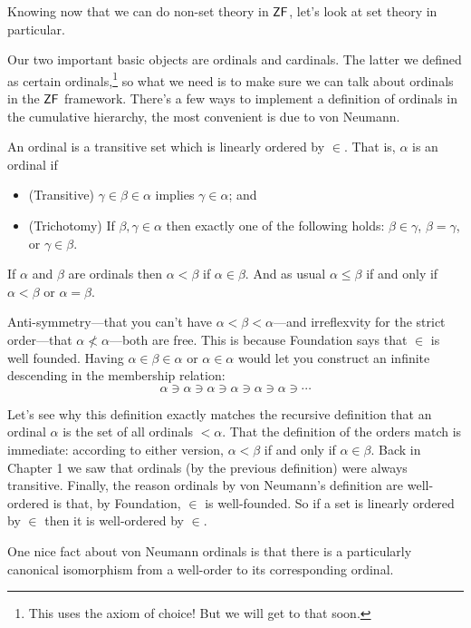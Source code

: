 \documentclass[10pt]{amsart}
\begin{document}
Knowing now that we can do non-set theory in $\mathsf{ZF}$, let's look at set theory in particular.

Our two important basic objects are ordinals and cardinals. The latter we defined as certain ordinals,\footnote{This uses the axiom of choice! But we will get to that soon.}
so what we need is to make sure we can talk about ordinals in the $\mathsf{ZF}$ framework. There's a few ways to implement a definition of ordinals in the cumulative hierarchy, the most convenient is due to von Neumann.

\begin{definition}
An ordinal is a transitive set which is linearly ordered by $\in$. That is, $\alpha$ is an ordinal if
\begin{itemize}
\item (Transitive) $\gamma \in \beta \in \alpha$ implies $\gamma \in \alpha$; and
\item (Trichotomy) If $\beta,\gamma \in \alpha$ then exactly one of the following holds: $\beta \in \gamma$, $\beta = \gamma$, or $\gamma \in \beta$.
\end{itemize}
If $\alpha$ and $\beta$ are ordinals then $\alpha < \beta$ if $\alpha \in \beta$. And as usual $\alpha \le \beta$ if and only if $\alpha < \beta$ or $\alpha = \beta$.
\end{definition}

\begin{remark}
Anti-symmetry---that you can't have $\alpha < \beta < \alpha$---and irreflexvity for the strict order---that $\alpha \not < \alpha$---both are free. This is because Foundation says that $\in$ is well founded. Having $\alpha \in \beta \in \alpha$ or $\alpha \in \alpha$ would let you construct an infinite descending in the membership relation:
\[
\alpha \ni \alpha \ni \alpha \ni \alpha \ni \alpha \ni \alpha \ni \cdots
\]
\end{remark}

Let's see why this definition exactly matches the recursive definition that an ordinal $\alpha$ is the set of all ordinals $< \alpha$. That the definition of the orders match is immediate: according to either version, $\alpha < \beta$ if and only if $\alpha \in \beta$. Back in Chapter 1 we saw that ordinals (by the previous definition) were always transitive. Finally, the reason ordinals by von Neumann's definition are well-ordered is that, by Foundation, $\in$ is well-founded. So if a set is linearly ordered by $\in$ then it is well-ordered by $\in$. 

One nice fact about von Neumann ordinals is that there is a particularly canonical isomorphism from a well-order to its corresponding ordinal.
\end{document}
